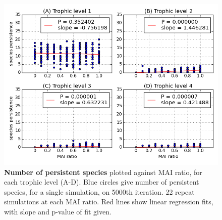 

\begin{figure}
	\centering
	\includegraphics[width=0.8\linewidth]{"figures/persistence/species_richness_per_trophic_level"}
	\caption{\textbf{Number of persistent species} plotted against MAI ratio, for each trophic level (A-D). Blue circles give number of persistent species, for a single simulation, on 5000th iteration. 22 repeat simulations at each MAI ratio. Red lines show linear regression fits, with slope and p-value of fit given.}
	\label{fig:mvp_species_per_tl}
\end{figure}


